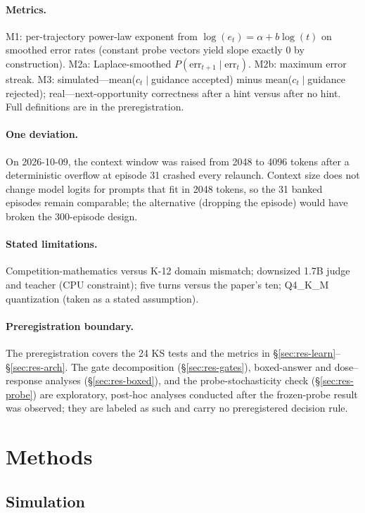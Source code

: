 \documentclass[12pt,a4paper]{article}
\begin{document}
\paragraph{Metrics.} M1: per-trajectory power-law exponent from
$\log(e_t)=\alpha+b\log(t)$ on smoothed error rates (constant probe vectors
yield slope exactly 0 by construction). M2a:
Laplace-smoothed $P(\text{err}_{t+1}\mid\text{err}_t)$. M2b: maximum error
streak. M3: simulated---mean($c_t\mid$guidance accepted) minus
mean($c_t\mid$guidance rejected); real---next-opportunity correctness after
a hint versus after no hint. Full definitions are in the preregistration.

\paragraph{One deviation.} On 2026-10-09, the context window was raised from
2048 to 4096 tokens after a deterministic overflow at episode 31 crashed
every relaunch. Context size does not change model logits for prompts that
fit in 2048 tokens, so the 31 banked episodes remain comparable; the
alternative (dropping the episode) would have broken the 300-episode design.

\paragraph{Stated limitations.} Competition-mathematics versus K-12 domain
mismatch; downsized 1.7B judge and teacher (CPU constraint); five turns
versus the paper's ten; Q4\_K\_M quantization (taken as a stated assumption).

\paragraph{Preregistration boundary.} The preregistration covers the 24 KS
tests and the metrics in \S\ref{sec:res-learn}--\S\ref{sec:res-arch}. The gate
decomposition (\S\ref{sec:res-gates}), boxed-answer and dose--response
analyses (\S\ref{sec:res-boxed}), and the probe-stochasticity check
(\S\ref{sec:res-probe}) are exploratory, post-hoc analyses conducted after
the frozen-probe result was observed; they are labeled as such and carry no
preregistered decision rule.

\section{Methods}
\label{sec:methods}

\subsection{Simulation}
\end{document}
